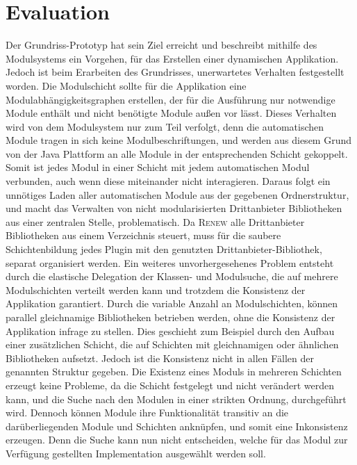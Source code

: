 \section{Evaluation}
	Der Grundriss-Prototyp hat sein Ziel erreicht und beschreibt mithilfe des Modulsystems ein Vorgehen, für das Erstellen einer dynamischen Applikation. Jedoch ist beim Erarbeiten des Grundrisses, unerwartetes Verhalten festgestellt worden. Die Modulschicht sollte für die Applikation eine Modulabhängigkeitsgraphen erstellen, der für die Ausführung nur notwendige Module enthält und nicht benötigte Module außen vor lässt. Dieses Verhalten wird von dem Modulsystem nur zum Teil verfolgt, denn die automatischen Module tragen in sich keine Modulbeschriftungen, und werden aus diesem Grund von der Java Plattform an alle Module in der entsprechenden Schicht gekoppelt. Somit ist jedes Modul in einer Schicht mit jedem automatischen Modul verbunden, auch wenn diese miteinander nicht interagieren. Daraus folgt ein unnötiges Laden aller automatischen Module aus der gegebenen Ordnerstruktur, und macht das Verwalten von nicht modularisierten Drittanbieter Bibliotheken aus einer zentralen Stelle, problematisch. Da \textsc{Renew} alle Drittanbieter Bibliotheken aus einem Verzeichnis steuert, muss für die saubere Schichtenbildung jedes Plugin mit den genutzten Drittanbieter-Bibliothek, separat organisiert werden.\newline
	Ein weiteres unvorhergesehenes Problem entsteht durch die elastische Delegation der Klassen- und Modulsuche, die auf mehrere Modulschichten verteilt werden kann und trotzdem die Konsistenz der Applikation garantiert.
	Durch die variable Anzahl an Modulschichten, können parallel gleichnamige Bibliotheken betrieben werden, ohne die Konsistenz der Applikation infrage zu stellen. Dies geschieht zum Beispiel durch den Aufbau einer zusätzlichen Schicht, die auf Schichten mit gleichnamigen oder ähnlichen Bibliotheken aufsetzt. Jedoch ist die Konsistenz nicht in allen Fällen der genannten Struktur gegeben. \newline
	Die Existenz eines Moduls in mehreren Schichten erzeugt keine Probleme, da die Schicht festgelegt und nicht verändert werden kann, und die Suche nach den Modulen in einer strikten Ordnung, durchgeführt wird. Dennoch können Module ihre Funktionalität transitiv an die darüberliegenden Module und Schichten anknüpfen, und somit eine Inkonsistenz erzeugen. Denn die Suche kann nun nicht entscheiden, welche für das Modul zur Verfügung gestellten Implementation ausgewählt werden soll. \newline
